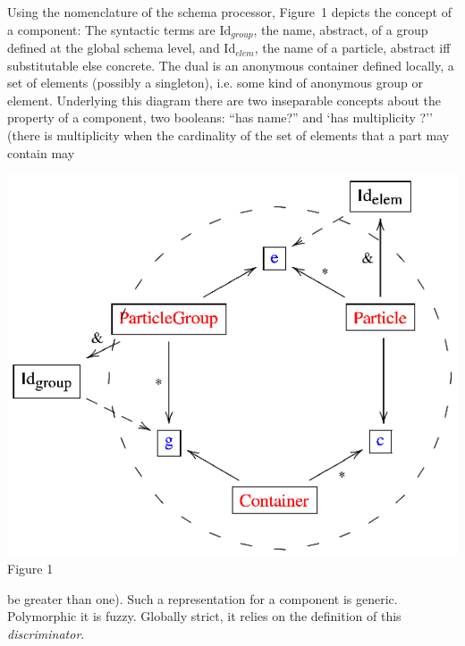 \noindent
\begin{minipage}[h]{5.2cm}
Using the nomenclature of the schema processor, Figure~1
depicts the concept of a component: 
The syntactic terms are Id$_{group}$, the name, abstract, of a group 
defined at the global schema level, and Id$_{elem}$, the name of a particle,
abstract iff substitutable else concrete. The dual is an anonymous 
container defined locally, a set of 
 elements (possibly a singleton),
i.e. some kind of anonymous group or element. Underlying this diagram there are
two inseparable concepts about the property of a component, two booleans: 
``has name?'' and `has multiplicity ?'' (there is multiplicity 
when 
the cardinality of the set of elements that a part may contain may
\end{minipage}
\begin{minipage}[h]{8.8cm}
 \begin{center}
 \includegraphics[]{part8/Viallefond_P52/P52_1.eps}
 \\Figure 1
 \end{center}

\end{minipage}
\hfill
be greater than one). Such a representation for a component is generic. Polymorphic it is fuzzy.
Globally strict, it relies on the definition of this 
{\it discriminator}.


